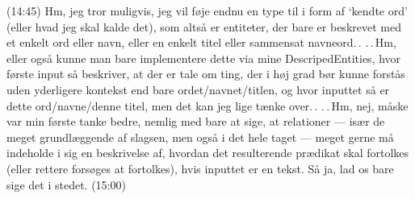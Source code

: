 \documentclass{report}
\begin{document}
(14:45) Hm, jeg tror muligvis, jeg vil føje endnu en type til i form af `kendte ord' (eller hvad jeg skal kalde det), som altså er entiteter, der bare er beskrevet med et enkelt ord eller navn, eller en enkelt titel eller sammensat navneord.\,. .\,.\,Hm, eller også kunne man bare implementere dette via mine DescripedEntities, hvor første input så beskriver, at der er tale om ting, der i høj grad bør kunne forstås uden yderligere kontekst end bare ordet/navnet/titlen, og hvor inputtet så er dette ord/navne/denne titel, men det kan jeg lige tænke over.\,. .\,.\,Hm, nej, måske var min første tanke bedre, nemlig med bare at sige, at relationer --- især de meget grundlæggende af slagsen, men også i det hele taget --- meget gerne må indeholde i sig en beskrivelse af, hvordan det resulterende prædikat skal fortolkes (eller rettere forsøges at fortolkes), hvis inputtet er en tekst. Så ja, lad os bare sige det i stedet. (15:00)
\end{document}
